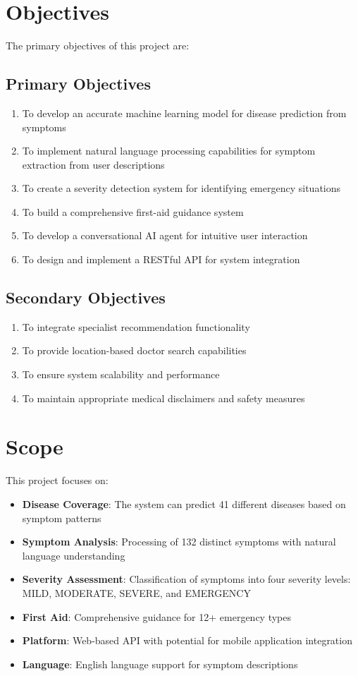 \section{Objectives}
The primary objectives of this project are:

\subsection{Primary Objectives}
\begin{enumerate}
    \item To develop an accurate machine learning model for disease prediction from symptoms
    \item To implement natural language processing capabilities for symptom extraction from user descriptions
    \item To create a severity detection system for identifying emergency situations
    \item To build a comprehensive first-aid guidance system
    \item To develop a conversational AI agent for intuitive user interaction
    \item To design and implement a RESTful API for system integration
\end{enumerate}

\subsection{Secondary Objectives}
\begin{enumerate}
    \item To integrate specialist recommendation functionality
    \item To provide location-based doctor search capabilities
    \item To ensure system scalability and performance
    \item To maintain appropriate medical disclaimers and safety measures
\end{enumerate}

\section{Scope}
This project focuses on:

\begin{itemize}
    \item \textbf{Disease Coverage}: The system can predict 41 different diseases based on symptom patterns
    \item \textbf{Symptom Analysis}: Processing of 132 distinct symptoms with natural language understanding
    \item \textbf{Severity Assessment}: Classification of symptoms into four severity levels: MILD, MODERATE, SEVERE, and EMERGENCY
    \item \textbf{First Aid}: Comprehensive guidance for 12+ emergency types
    \item \textbf{Platform}: Web-based API with potential for mobile application integration
    \item \textbf{Language}: English language support for symptom descriptions
\end{itemize}

